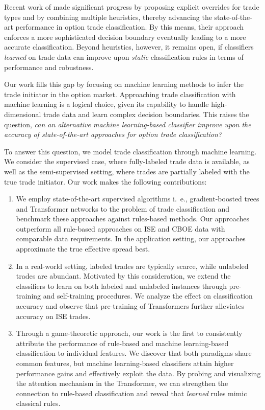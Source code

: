 
Recent work of \textcite[\checkmark][13--16]{grauerOptionTradeClassification2022} made significant progress by proposing explicit overrides for trade types and by combining multiple heuristics, thereby advancing the state-of-the-art performance in option trade classification. By this means, their approach enforces a more sophisticated decision boundary eventually leading to a more accurate classification. Beyond heuristics, however, it remains open, if classifiers \emph{learned} on trade data can improve upon \emph{static} classification rules in terms of performance and robustness.

Our work fills this gap by focusing on machine learning methods to infer the trade initiator in the option market. Approaching trade classification with machine learning is a logical choice, given its capability to handle high-dimensional trade data and learn complex decision boundaries. This raises the question, \emph{can an alternative machine learning-based classifier improve upon the accuracy of state-of-the-art approaches for option trade classification?}

To answer this question, we model trade classification through machine learning. We consider the supervised case, where fully-labeled trade data is available, as well as the semi-supervised setting, where trades are partially labeled with the true trade initiator. Our work makes the following contributions:
\begin{enumerate}[label=(\roman*),noitemsep]
    \item We employ state-of-the-art supervised algorithms i.~e., gradient-boosted trees and Transformer networks to the problem of trade classification and benchmark these approaches against rules-based methods. Our approaches outperform all rule-based approaches on \gls{ISE} and \gls{CBOE} data with comparable data requirements. In the application setting, our approaches approximate the true effective spread best.
    \item In a real-world setting, labeled trades are typically scarce, while unlabeled trades are abundant. Motivated by this consideration, we extend the classifiers to learn on both labeled and unlabeled instances through pre-training and self-training procedures. We analyze the effect on classification accuracy and observe that pre-training of Transformers further alleviates accuracy on \gls{ISE} trades.
    \item Through a game-theoretic approach, our work is the first to consistently attribute the performance of rule-based and machine learning-based classification to individual features. We discover that both paradigms share common features, but machine learning-based classifiers attain higher performance gains and effectively exploit the data. By probing and visualizing the attention mechanism in the Transformer, we can strengthen the connection to rule-based classification and reveal that \emph{learned} rules mimic classical rules.
\end{enumerate}

